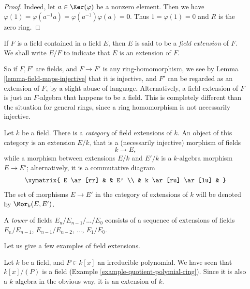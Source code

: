 \begin{proof}
Indeed, let $a \in \Ker(\varphi)$ be a nonzero element. Then we have
$\varphi(1) = \varphi(a^{-1} a) = \varphi(a^{-1}) \varphi(a) = 0$.
Thus $1 = \varphi(1) = 0$ and $R$ is the zero ring.
\end{proof}

\begin{definition}
\label{definition-extension}
If $F$ is a field contained in a field $E$, then $E$ is said
to be a {\it field extension} of $F$. We shall write $E/F$ to indicate
that $E$ is an extension of $F$.
\end{definition}

\noindent
So if $F, F'$ are fields, and $F \to F'$ is any ring-homomorphism, we see by
Lemma \ref{lemma-field-maps-injective} that it is injective, and $F'$ can be
regarded as an extension of $F$, by a slight abuse of language. Alternatively,
a field extension of $F$ is just an $F$-algebra that happens to be a field.
This is completely different than the situation for general rings, since a
ring homomorphism is not necessarily injective.

\medskip\noindent
Let $k$ be a field. There is a {\it category} of field extensions of $k$.
An object of this category is an extension $E/k$, that is a
(necessarily injective) morphism of fields
$$
k \to E,
$$
while a morphism between extensions $E/k$ and $E'/k$ is a $k$-algebra
morphism $E \to E'$; alternatively, it is a commutative diagram
$$
\xymatrix{
E \ar[rr] & & E' \\
& k \ar[ru] \ar[lu] &
}
$$
The set of morphisms $E \to E'$ in the category of extensions of $k$
will be denoted by $\Mor_k(E, E')$.

\begin{definition}
\label{definition-tower}
A {\it tower} of fields $E_n/E_{n - 1}/\ldots/E_0$ consists of a sequence of
extensions of fields
$E_n/E_{n - 1}$, $E_{n - 1}/E_{n - 2}$, $\ldots$, $E_1/E_0$.
\end{definition}

\noindent
Let us give a few examples of field extensions.

\begin{example}
\label{example-monogenic-extension}
Let $k$ be a field, and $P \in k[x]$ an irreducible polynomial. We have
seen that $k[x]/(P)$ is a field (Example \ref{example-quotient-polymial-ring}).
Since it is also a $k$-algebra in the obvious way, it is an extension of $k$.
\end{example}


